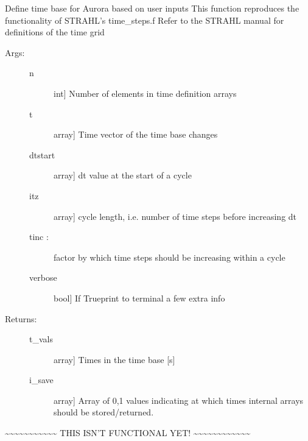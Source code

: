 \documentclass[letterpaper,10pt,english]{sphinxmanual}
\begin{document}

\begin{fulllineitems}
\label{\detokenize{aurora:aurora.grids_utils.create_time_grid_new}}
Define time base for Aurora based on user inputs
This function reproduces the functionality of STRAHL’s time\_steps.f
Refer to the STRAHL manual for definitions of the time grid
\begin{description}
\item[{Args:}] \leavevmode\begin{description}
\item[{n}] \leavevmode{[}int{]}
Number of elements in time definition arrays

\item[{t}] \leavevmode{[}array{]}
Time vector of the time base changes

\item[{dtstart}] \leavevmode{[}array{]}
dt value at the start of a cycle

\item[{itz}] \leavevmode{[}array{]}
cycle length, i.e. number of time steps before increasing dt

\item[{tinc :}] \leavevmode
factor by which time steps should be increasing within a cycle

\item[{verbose}] \leavevmode{[}bool{]}
If Trueprint to terminal a few extra info

\end{description}

\item[{Returns:}] \leavevmode\begin{description}
\item[{t\_vals}] \leavevmode{[}array{]}
Times in the time base {[}s{]}

\item[{i\_save}] \leavevmode{[}array{]}
Array of 0,1 values indicating at which times internal arrays should be stored/returned.

\end{description}

\end{description}

\textasciitilde{}\textasciitilde{}\textasciitilde{}\textasciitilde{}\textasciitilde{}\textasciitilde{}\textasciitilde{}\textasciitilde{}\textasciitilde{}\textasciitilde{}\textasciitilde{} THIS ISN’T FUNCTIONAL YET! \textasciitilde{}\textasciitilde{}\textasciitilde{}\textasciitilde{}\textasciitilde{}\textasciitilde{}\textasciitilde{}\textasciitilde{}\textasciitilde{}\textasciitilde{}\textasciitilde{}\textasciitilde{}

\end{fulllineitems}
\end{document}
